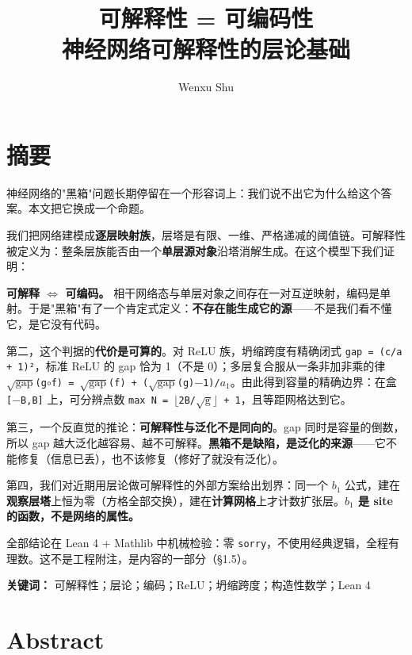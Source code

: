 \documentclass[11pt,a4paper]{ctexart}
\title{可解释性 = 可编码性\\[0.3em]\large 神经网络可解释性的层论基础}
\author{Wenxu Shu}
\date{}
\begin{document}
\maketitle
\bigskip

\section*{摘要}

神经网络的"黑箱"问题长期停留在一个形容词上：我们说不出它为什么给这个答案。本文把它换成一个命题。

我们把网络建模成\textbf{逐层映射族}，层塔是有限、一维、严格递减的阈值链。可解释性被定义为：整条层族能否由一个\textbf{单层源对象}沿塔消解生成。在这个模型下我们证明：

\textbf{可解释 \ensuremath{\Longleftrightarrow} 可编码。} 相干网络态与单层对象之间存在一对互逆映射，编码是单射。于是"黑箱"有了一个肯定式定义：\textbf{不存在能生成它的源}——不是我们看不懂它，是它没有代码。

第二，这个判据的\textbf{代价是可算的}。对 ReLU 族，坍缩跨度有精确闭式 \texttt{gap = (c/a + 1)²}，标准 ReLU 的 gap 恰为 1（不是 0）；多层复合服从一条非加非乘的律 \texttt{\ensuremath{\sqrt{\mathrm{gap}}}(g\ensuremath{\circ}f) = \ensuremath{\sqrt{\mathrm{gap}}}(f) + (\ensuremath{\sqrt{\mathrm{gap}}}(g)\ensuremath{-}1)/\ensuremath{a_{1}}}。由此得到容量的精确边界：在盒 \texttt{[\ensuremath{-}B,B]} 上，可分辨点数 \texttt{max N = \ensuremath{\lfloor}2B/\ensuremath{\sqrt{\mathrm{g}}}\ensuremath{\rfloor} + 1}，且等距网格达到它。

第三，一个反直觉的推论：\textbf{可解释性与泛化不是同向的}。gap 同时是容量的倒数，所以 gap 越大泛化越容易、越不可解释。\textbf{黑箱不是缺陷，是泛化的来源}——它不能修复（信息已丢），也不该修复（修好了就没有泛化）。

第四，我们对近期用层论做可解释性的外部方案给出划界：同一个 \texttt{\ensuremath{b_{1}}} 公式，建在\textbf{观察层塔}上恒为零（方格全部交换），建在\textbf{计算网格}上才计数扩张层。\textbf{\texttt{\ensuremath{b_{1}}} 是 site 的函数，不是网络的属性。}

全部结论在 Lean 4 + Mathlib 中机械检验：零 \texttt{sorry}，不使用经典逻辑，全程有理数。这不是工程附注，是内容的一部分（§1.5）。

\textbf{关键词：} 可解释性；层论；编码；ReLU；坍缩跨度；构造性数学；Lean 4

\bigskip

\section*{Abstract}
\end{document}
